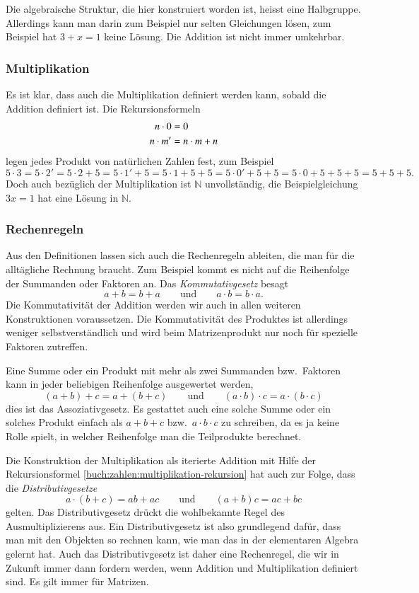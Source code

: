 Die algebraische Struktur, die hier konstruiert worden ist, heisst
eine Halbgruppe.
Allerdings kann man darin zum Beispiel nur selten Gleichungen
lösen, zum Beispiel hat $3+x=1$ keine Lösung.
Die Addition ist nicht immer umkehrbar.

\subsubsection{Multiplikation}
Es ist klar, dass auch die Multiplikation definiert werden kann, 
sobald die Addition definiert ist.
Die Rekursionsformeln
\begin{align}
n\cdot 0 &= 0 \notag \\
n\cdot m' &= n\cdot m + n
\label{buch:zahlen:multiplikation-rekursion}
\end{align}
legen jedes Produkt von natürlichen Zahlen fest, zum Beispiel
\[
5\cdot 3
=
5\cdot 2'
=
5\cdot 2 + 5
=
5\cdot 1' + 5
=
5\cdot 1 + 5 + 5
=
5\cdot 0' + 5 + 5
=
5\cdot 0 + 5 + 5 + 5
=
5 + 5 + 5.
\]
Doch auch bezüglich der Multiplikation ist $\mathbb{N}$ unvollständig,
die Beispielgleichung $3x=1$ hat eine Lösung in $\mathbb{N}$.

\subsubsection{Rechenregeln}
Aus den Definitionen lassen sich auch die Rechenregeln ableiten,
die man für die alltägliche Rechnung braucht.
Zum Beispiel kommt es nicht auf die Reihenfolge der Summanden
oder Faktoren an. 
Das {\em Kommutativgesetz} besagt
\[
a+b=b+a
\qquad\text{und}\qquad
a\cdot b = b\cdot a.
\]
%
Die Kommutativität der Addition werden wir auch in allen weiteren
Konstruktionen voraussetzen.
Die Kommutativität des Produktes ist allerdings weniger selbstverständlich
und wird beim Matrizenprodukt nur noch für spezielle Faktoren zutreffen.

Eine Summe oder ein Produkt mit mehr als zwei Summanden bzw.~Faktoren
kann in jeder beliebigen Reihenfolge ausgewertet werden,
\[
(a+b)+c
=
a+(b+c)
\qquad\text{und}\qquad
(a\cdot b)\cdot c
=
a\cdot (b\cdot c)
\]
dies ist das Assoziativgesetz.
Es gestattet auch eine solche Summe oder ein solches Produkt einfach
als $a+b+c$ bzw.~$a\cdot b\cdot c$ zu schreiben, da es ja keine Rolle
spielt, in welcher Reihenfolge man die Teilprodukte berechnet.

Die Konstruktion der Multiplikation als iterierte Addition mit Hilfe
der Rekursionsformel \eqref{buch:zahlen:multiplikation-rekursion}
hat auch zur Folge, dass die {\em Distributivgesetze}
\[
a\cdot(b+c) = ab+ac
\qquad\text{und}\qquad
(a+b)c = ac+bc
\]
gelten.
Das Distributivgesetz drückt die wohlbekannte Regel des
Ausmultiplizierens aus.
Ein Distributivgesetz ist also grundlegend dafür, dass man mit den
Objekten so rechnen kann, wie man das in der elementaren Algebra 
gelernt hat.
Auch das Distributivgesetz ist daher eine Rechenregel, die wir in
Zukunft immer dann fordern werden, wenn Addition und Multiplikation
definiert sind.
Es gilt immer für Matrizen.


